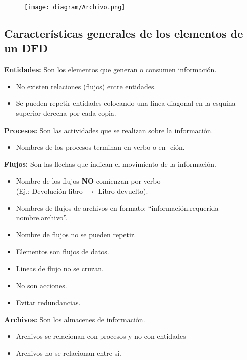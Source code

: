 \documentclass{templateNote}
\begin{document}
\begin{figure}[H]
    \centering
    \texttt{[image: diagram/Archivo.png]}
\end{figure}

\subsection{Características generales de los elementos de un DFD}
\noindent\textbf{Entidades:} Son los elementos que generan o consumen información.
\begin{itemize}
    \item No existen relaciones (flujos) entre entidades.
    
    \item Se pueden repetir entidades colocando una linea diagonal en la esquina superior derecha por cada copia.
\end{itemize}
\textbf{Procesos:} Son las actividades que se realizan sobre la información.
\begin{itemize}
    \item Nombres de los procesos terminan en verbo o en -ción.
\end{itemize}
\textbf{Flujos:} Son las flechas que indican el movimiento de la información.
\begin{itemize}
    \item Nombre de los flujos \textbf{NO} comienzan por verbo \\(Ej.: Devolución libro $\rightarrow$ Libro devuelto).
    
    \item Nombres de flujos de archivos en formato: ``información.requerida-nombre.archivo''.
    
    \item Nombre de flujos no se pueden repetir.
    
    \item Elementos son flujos de datos.
    
    \item Lineas de flujo no se cruzan.
    
    \item No son acciones.
    
    \item Evitar redundancias.
\end{itemize}
\textbf{Archivos:} Son los almacenes de información.
\begin{itemize}
    \item Archivos se relacionan con procesos y no con entidades
    
    \item Archivos no se relacionan entre si.
\end{itemize}
\end{document}
